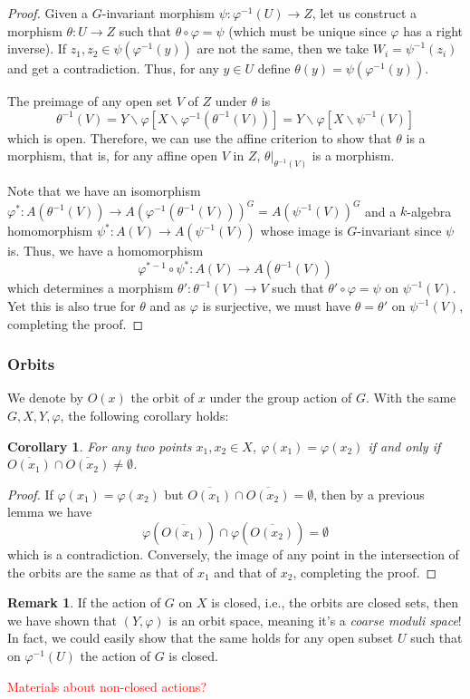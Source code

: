 \documentclass[12pt]{article}
\newtheorem{corollary}{Corollary}[section]
\theoremstyle{remark}
\theoremstyle{definition}
\newtheorem{remark}{Remark}[section]
\begin{document}
    \begin{proof}
        Given a $G$-invariant morphism $\psi:\varphi^{-1}(U)\to Z$, let us construct a morphism $\theta:U\to Z$ such that $\theta\circ\varphi=\psi$ (which must be unique since $\varphi$ has a right inverse). If $z_1,z_2\in\psi(\varphi^{-1}(y))$ are not the same, then we take $W_i=\psi^{-1}(z_i)$ and get a contradiction. Thus, for any $y\in U$ define $\theta(y)=\psi(\varphi^{-1}(y))$.

        The preimage of any open set $V$ of $Z$ under $\theta$ is
        \[\theta^{-1}(V)=Y\backslash\varphi\left[X\backslash\varphi^{-1}(\theta^{-1}(V))\right]=Y\backslash\varphi\left[X\backslash\psi^{-1}(V)\right]\]
        which is open. Therefore, we can use the affine criterion to show that $\theta$ is a morphism, that is, for any affine open $V$ in $Z$, $\theta|_{\theta^{-1}(V)}$ is a morphism.

        Note that we have an isomorphism $\varphi^*:A(\theta^{-1}(V))\to A(\varphi^{-1}(\theta^{-1}(V)))^G=A(\psi^{-1}(V))^G$ and a $k$-algebra homomorphism $\psi^*:A(V)\to A(\psi^{-1}(V))$ whose image is $G$-invariant since $\psi$ is. Thus, we have a homomorphism
        \[\varphi^{*-1}\circ\psi^*:A(V)\to A(\theta^{-1}(V))\]
        which determines a morphism $\theta':\theta^{-1}(V)\to V$ such that $\theta'\circ\varphi=\psi$ on $\psi^{-1}(V)$. Yet this is also true for $\theta$ and as $\varphi$ is surjective, we must have $\theta=\theta'$ on $\psi^{-1}(V)$, completing the proof.
    \end{proof}
    \subsubsection{Orbits}
    We denote by $O(x)$ the orbit of $x$ under the group action of $G$. With the same $G,X,Y,\varphi$, the following corollary holds:
    \begin{corollary}
        For any two points $x_1,x_2\in X$, $\varphi(x_1)=\varphi(x_2)$ if and only if $\overline{O(x_1)}\cap \overline{O(x_2)}\neq\emptyset$.
    \end{corollary}
    \begin{proof}
        If $\varphi(x_1)=\varphi(x_2)$ but $\overline{O(x_1)}\cap \overline{O(x_2)}=\emptyset$, then by a previous lemma we have 
        \[\varphi\left(\overline{O(x_1)}\right)\cap\varphi\left(\overline{O(x_2)}\right)=\emptyset\] 
        which is a contradiction. Conversely, the image of any point in the intersection of the orbits are the same as that of $x_1$ and that of $x_2$, completing the proof.
    \end{proof}
    \begin{remark}
        If the action of $G$ on $X$ is closed, i.e., the orbits are closed sets, then we have shown that $(Y,\varphi)$ is an orbit space, meaning it's a \textit{coarse moduli space}! In fact, we could easily show that the same holds for any open subset $U$ such that on $\varphi^{-1}(U)$ the action of $G$ is closed.
    \end{remark}
    \textcolor{red}{Materials about non-closed actions?}
\end{document}
